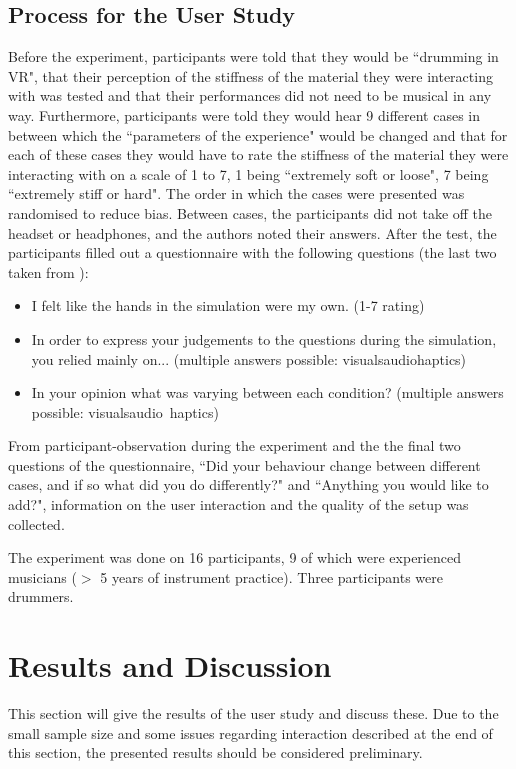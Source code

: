 \documentclass{article}
\begin{document}
\subsection{Process for the User Study}
Before the experiment, participants were told that they would be ``drumming in VR", that their perception of the stiffness of the material they were interacting with was tested and that their performances did not need to be musical in any way. Furthermore, participants were told they would hear 9 different cases in between which the ``parameters of the experience" would be changed and that for each of these cases they would have to rate the stiffness of the material they were interacting with on a scale of 1 to 7, 1 being ``extremely soft or loose", 7 being ``extremely stiff or hard". The order in which the cases were presented was randomised to reduce bias. Between cases, the participants did not take off the headset or headphones, and the authors noted their answers. After the test, the participants filled out a questionnaire with the following questions (the last two taken from \cite{avanzini2006}):

\begin{itemize}
    \item I felt like the hands in the simulation were my own. (1-7 rating)
    \item In order to express your judgements to the questions during the simulation, you relied mainly on... (multiple answers possible: visuals\textbar audio\textbar haptics)
    \item In your opinion what was varying between each condition? (multiple answers possible: visuals\textbar audio\textbar\ haptics)
\end{itemize}
From participant-observation during the experiment and the the final two questions of the questionnaire, ``Did your behaviour change between different cases, and if so what did you do differently?" and ``Anything you would like to add?", information on the user interaction and the quality of the setup was collected.

The experiment was done on 16 participants, 9 of which were experienced musicians ($>$ 5 years of instrument practice). Three participants were drummers. 

\section{Results and Discussion}\label{sec:resDisc}
This section will give the results of the user study and discuss these. Due to the small sample size and some issues regarding interaction described at the end of this section, the presented results should be considered preliminary.
\end{document}
